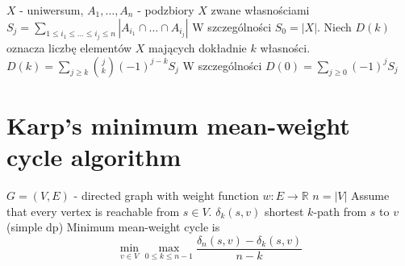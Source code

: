 $X$ - uniwersum, $A_1, \dots, A_n$ - podzbiory $X$ zwane własnościami
$S_j = \sum_{1\le i_1 \le \dots \le i_j \le n} | A_{i_1} \cap \dots \cap A_{i_j}|$
W szczególności $S_0 = |X|$. Niech $D(k)$ oznacza liczbę elementów $X$ mających dokładnie $k$ własności.
$D(k) = \sum_{j\ge k}\binom{j}{k} \left(-1\right)^{j-k}S_j$
W szczególności $D(0) = \sum_{j \ge 0} \left(-1\right)^j S_j$

\section{Karp’s minimum mean-weight cycle algorithm}
$G = (V, E)$ - directed graph with weight function $w : E \to \mathbb{R}$
$n = |V|$
Assume that every vertex is reachable from $s \in V$.
$\delta_k(s, v)$ shortest $k$-path from $s$ to $v$ (simple dp)
Minimum mean-weight cycle is
$$ \min_{v\in V} \max_{0 \leq k \leq n-1} \frac{\delta_n(s, v) - \delta_k(s, v)}{n - k} $$

